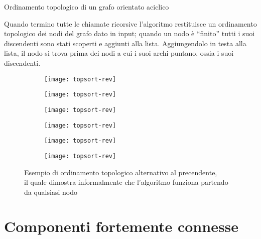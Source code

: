 \begin{algorithm}[H]
	\caption[Ordinamento topologico]{Ordinamento topologico di un grafo orientato aciclico}
	
	
\end{algorithm}

Quando termino tutte le chiamate ricorsive l'algoritmo restituisce un ordinamento topologico dei nodi del grafo dato in input; quando un nodo è \enquote{finito} tutti i suoi discendenti sono stati scoperti e aggiunti alla lista.
Aggiungendolo in testa alla lista, il nodo si trova prima dei nodi a cui i suoi archi puntano, ossia i suoi discendenti.

\begin{figure}[H]

	\begin{subfigure}{.15\textwidth}
		\texttt{[image: topsort-rev]}
	\end{subfigure}\hfill
	\begin{subfigure}{.15\textwidth}
		\texttt{[image: topsort-rev]}
	\end{subfigure}\hfill
	\begin{subfigure}{.15\textwidth}
		\texttt{[image: topsort-rev]}
	\end{subfigure}\hfill
	\begin{subfigure}{.15\textwidth}
		\texttt{[image: topsort-rev]}
	\end{subfigure}\hfill
	\begin{subfigure}{.15\textwidth}
		\texttt{[image: topsort-rev]}
	\end{subfigure}\hfill
	\begin{subfigure}{.15\textwidth}
		\texttt{[image: topsort-rev]}
	\end{subfigure}

	\caption[Esempio di ordinamento topologico alternativo]{Esempio di ordinamento topologico alternativo al precendente,\\il quale dimostra informalmente che l'algoritmo funziona partendo da qualsiasi nodo}

\end{figure}

\clearpage
\section{Componenti fortemente connesse}

